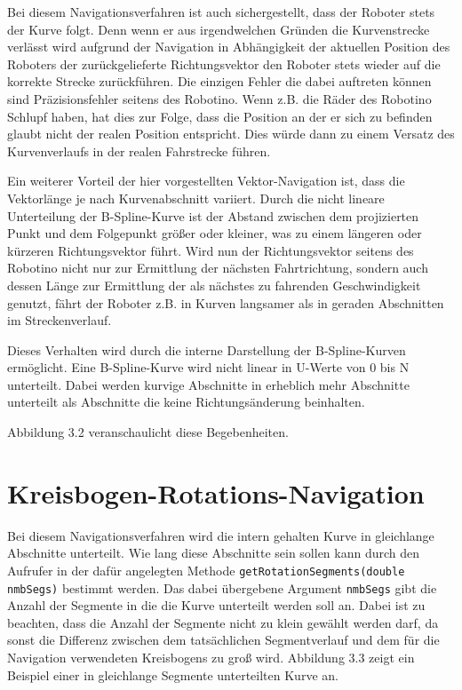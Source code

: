 Bei diesem Navigationsverfahren ist auch sichergestellt, dass der Roboter stets
der Kurve folgt. Denn wenn er aus irgendwelchen Gründen die Kurvenstrecke
verlässt wird aufgrund der Navigation in Abhängigkeit der aktuellen Position des
Roboters der zurückgelieferte Richtungsvektor den Roboter stets wieder auf die
korrekte Strecke zurückführen. Die einzigen Fehler die dabei auftreten können
sind Präzisionsfehler seitens des Robotino. Wenn z.B. die Räder des Robotino
Schlupf haben, hat dies zur Folge, dass die Position an der er sich zu befinden
glaubt nicht der realen Position entspricht. Dies würde dann zu einem Versatz
des Kurvenverlaufs in der realen Fahrstrecke führen.


Ein weiterer Vorteil der hier vorgestellten Vektor-Navigation ist, dass die
Vektorlänge je nach Kurvenabschnitt variiert. Durch die nicht lineare
Unterteilung der B-Spline-Kurve ist der Abstand zwischen dem projizierten Punkt
und dem Folgepunkt größer oder kleiner, was zu einem längeren oder kürzeren
Richtungsvektor führt. Wird nun der Richtungsvektor seitens des Robotino nicht
nur zur Ermittlung der nächsten Fahrtrichtung, sondern auch dessen Länge zur
Ermittlung der als nächstes zu fahrenden  Geschwindigkeit genutzt, fährt der
Roboter z.B. in Kurven langsamer als in geraden Abschnitten im Streckenverlauf.

Dieses Verhalten wird durch die interne Darstellung der B-Spline-Kurven
ermöglicht. Eine B-Spline-Kurve wird nicht linear in U-Werte von 0 bis N
unterteilt. Dabei werden kurvige Abschnitte in erheblich mehr Abschnitte
unterteilt als Abschnitte die keine Richtungsänderung beinhalten.

Abbildung 3.2 veranschaulicht diese Begebenheiten.



\section{Kreisbogen-Rotations-Navigation}

Bei diesem Navigationsverfahren wird die intern gehalten Kurve in gleichlange
Abschnitte unterteilt. Wie lang diese Abschnitte sein sollen kann durch den
Aufrufer in der dafür angelegten Methode \verb|getRotationSegments(double nmbSegs)|
bestimmt werden. Das dabei übergebene Argument \verb|nmbSegs| gibt die Anzahl
der Segmente in die die Kurve unterteilt werden soll an. Dabei ist zu beachten,
dass die Anzahl der Segmente nicht zu klein gewählt werden darf, da sonst die
Differenz zwischen dem tatsächlichen Segmentverlauf und dem für die Navigation
verwendeten Kreisbogens zu groß wird. Abbildung 3.3 zeigt ein Beispiel einer in
gleichlange Segmente unterteilten Kurve an.

